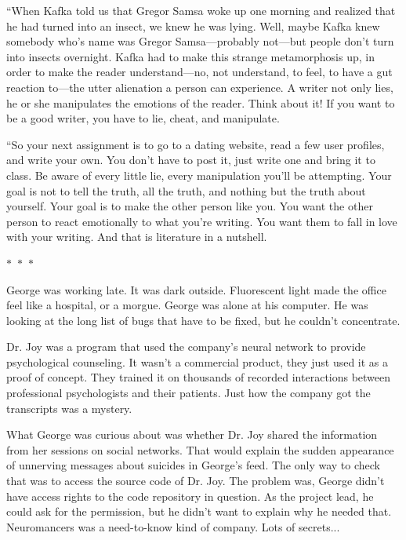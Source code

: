 \documentclass{memoir}
\newcommand{\starbreak}{%
\begin{center}
  $\ast$~$\ast$~$\ast$
\end{center}
}
\begin{document}
``When Kafka told us that Gregor Samsa woke up one morning and realized that he had turned into an insect, we knew he was lying. Well, maybe Kafka knew somebody who's name was Gregor Samsa---probably not---but people don't turn into insects overnight. Kafka had to make this strange metamorphosis up, in order to make the reader understand---no, not understand, to feel, to have a gut reaction to---the utter alienation a person can experience. A writer not only lies, he or she manipulates the emotions of the reader. Think about it! If you want to be a good writer, you have to lie, cheat, and manipulate.

``So your next assignment is to go to a dating website, read a few user profiles, and write your own. You don't have to post it, just write one and bring it to class. Be aware of every little lie, every manipulation you'll be attempting. Your goal is not to tell the truth, all the truth, and nothing but the truth about yourself. Your goal is to make the other person like you. You want the other person to react emotionally to what you're writing. You want them to fall in love with your writing. And that is literature in a nutshell. 

\starbreak

George was working late. It was dark outside. Fluorescent light made the office feel like a hospital, or a morgue. George was alone at his computer. He was looking at the long list of bugs that have to be fixed, but he couldn't concentrate. 

Dr. Joy was a program that used the company's neural network to provide psychological counseling. It wasn't a commercial product, they just used it as a proof of concept. They trained it on thousands of recorded interactions between professional psychologists and their patients. Just how the company got the transcripts was a mystery. 

What George was curious about was whether Dr. Joy shared the information from her sessions on social networks. That would explain the sudden appearance of unnerving messages about suicides in George's feed. The only way to check that was to access the source code of Dr. Joy. The problem was, George didn't have access rights to the code repository in question. As the project lead, he could ask for the permission, but he didn't want to explain why he needed that. Neuromancers was a need-to-know kind of company. Lots of secrets... 
\end{document}
